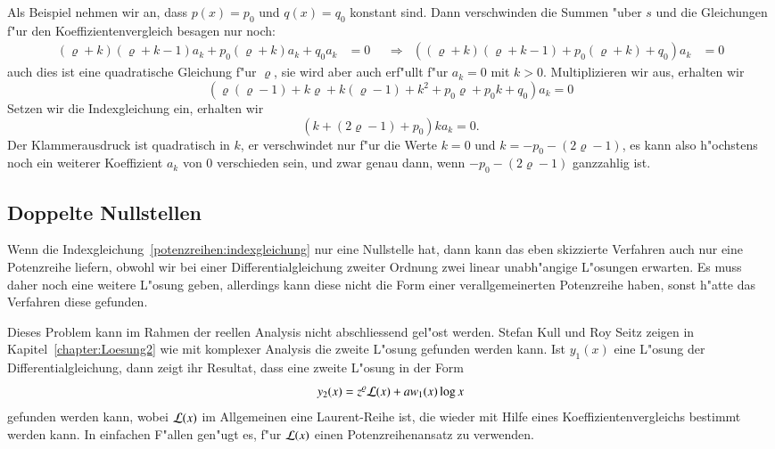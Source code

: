 \begin{beispiel}
Als Beispiel nehmen wir an, dass $p(x)=p_0$ und $q(x)=q_0$ konstant sind.
Dann verschwinden die Summen "uber $s$ und die Gleichungen f"ur den
Koeffizientenvergleich besagen nur noch:
\begin{equation}
\begin{aligned}
(\varrho + k)(\varrho+k-1)a_k+p_0(\varrho + k)a_k+q_0a_k&=0
&&\Rightarrow&
((\varrho + k)(\varrho+k-1)+p_0(\varrho + k)+q_0)a_k&=0
\end{aligned}
\end{equation}
auch dies ist eine quadratische Gleichung f"ur $\varrho$, sie wird
aber auch erf"ullt f"ur $a_k=0$ mit $k>0$.
Multiplizieren wir aus, erhalten wir
\[
(\varrho(\varrho - 1) + k\varrho+k(\varrho-1)+k^2+p_0\varrho + p_0k+q_0)a_k=0
\]
Setzen wir die Indexgleichung ein, erhalten wir
\[
(k+(2\varrho-1)+p_0)ka_k=0.
\]
Der Klammerausdruck ist quadratisch in $k$, er verschwindet nur f"ur
die Werte $k=0$ und $k=-p_0-(2\varrho-1)$, es kann also h"ochstens noch
ein weiterer Koeffizient $a_k$ von $0$ verschieden sein, und zwar genau
dann, wenn $-p_0-(2\varrho-1)$ ganzzahlig ist.
\end{beispiel}

\subsection{Doppelte Nullstellen\label{potenzreihen:doppeltens}}
Wenn die Indexgleichung~\eqref{potenzreihen:indexgleichung} nur eine 
Nullstelle hat, dann kann das eben skizzierte Verfahren auch nur eine
Potenzreihe liefern, obwohl wir bei einer Differentialgleichung
zweiter Ordnung zwei linear unabh"angige L"osungen erwarten.
Es muss daher noch eine weitere L"osung geben, allerdings kann diese
nicht die Form einer verallgemeinerten Potenzreihe haben, sonst h"atte
das Verfahren diese gefunden.

Dieses Problem kann im Rahmen der reellen Analysis nicht abschliessend
gel"ost werden.
Stefan Kull und Roy Seitz zeigen in Kapitel~\ref{chapter:Loesung2}
wie mit komplexer Analysis die zweite L"osung gefunden werden kann.
Ist $y_1(x)$ eine L"osung der Differentialgleichung, dann zeigt ihr
Resultat, dass eine zweite L"osung in der Form
\begin{equation}
y_2(x) = z^\varrho {\cal L}(x) + aw_1(x)\log x
\label{potenzreihe:2teloesung}
\end{equation}
gefunden werden kann, wobei ${\cal L}(x)$ im Allgemeinen eine Laurent-Reihe
ist, die wieder mit Hilfe eines Koeffizientenvergleichs bestimmt werden kann.
%
In einfachen F"allen gen"ugt es, f"ur ${\cal L}(x)$ einen Potenzreihenansatz
zu verwenden.

